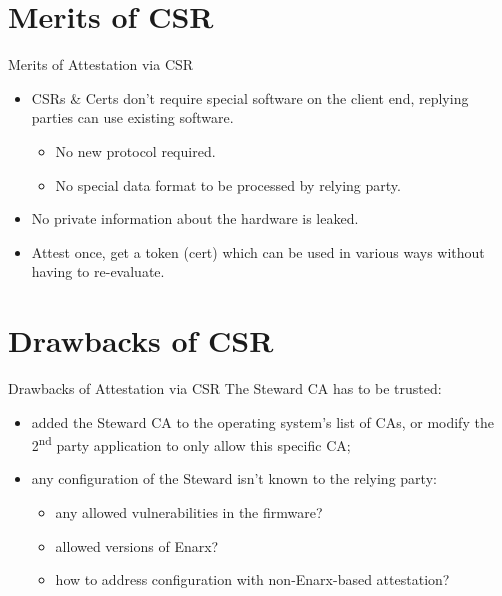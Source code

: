\documentclass[graphics,compress]{beamer}
\begin{document}
\section{Merits of CSR}
\begin{frame}{Merits of Attestation via CSR}
\begin{itemize}
    \item CSRs \& Certs don't require special software on the client end, replying parties can use existing software.
    \begin{itemize}
        \item No new protocol required.
        \item No special data format to be processed by relying party.
    \end{itemize}
    \item No private information about the hardware is leaked.
    \item Attest once, get a token (cert) which can be used in various ways without having to re-evaluate.
\end{itemize}
\end{frame}

\section{Drawbacks of CSR}
\begin{frame}{Drawbacks of Attestation via CSR}
The Steward CA has to be trusted:
\begin{itemize}
    \item added the Steward CA to the operating system's list of CAs, or modify the 2\textsuperscript{nd} party application to only allow this specific CA;
    \item any configuration of the Steward isn't known to the relying party:
    \begin{itemize}
        \item any allowed vulnerabilities in the firmware?
        \item allowed versions of Enarx?
        \item how to address configuration with non-Enarx-based attestation?
    \end{itemize}
\end{itemize}
\end{frame}
\end{document}
